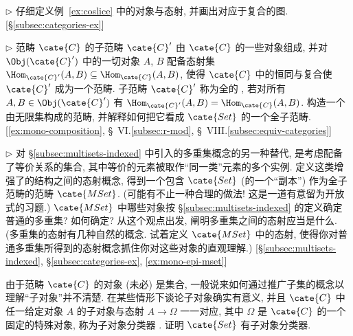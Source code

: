 \begin{prob}
\label{ex:coslice-details}
$\triangleright$ 仔细定义例~\ref{ex:coslice} 中的对象与态射, 并画出对应于复合的图. [\S\ref{subsec:categories-ex}]
\end{prob}

\begin{prob}
\label{ex:subcategory}
$\triangleright$ 范畴 $\cate{C}$ 的子范畴%
$\cate{C}'$ 由 $\cate{C}$ 的一些对象组成, 并对 $\Obj(\cate{C}')$ 中的一切对象 $A$, $B$ 配备态射集 $\Hom_{\cate{C}'}(A,B) \subseteq \Hom_{\cate{C}}(A,B)$, 使得 $\cate{C}$ 中的恒同与复合使 $\cate{C}'$ 成为一个范畴. 子范畴 $\cate{C}'$ 称为全的%
, 若对所有 $A, B \in \Obj(\cate{C}')$ 有 $\Hom_{\cate{C}'}(A,B) = \Hom_{\cate{C}}(A,B)$. 构造一个由无限集构成的范畴, 并解释如何把它看成 $\cate{Set}$ 的一个全子范畴. [\ref{ex:mono-composition}, \S~VI.\ref{subsec:r-mod}, \S~VIII.\ref{subsec:equiv-categories}]
\end{prob}

\begin{prob}
\label{ex:mset-category}
$\triangleright$ 对 \S\ref{subsec:multisets-indexed} 中引入的多重集概念的另一种替代, 是考虑配备了等价关系的集合, 其中等价的元素被取作``同一类''元素的多个实例. 定义这类增强了的结构之间的态射概念, 得到一个包含 $\cate{Set}$ (的一个``副本'') 作为全子范畴的范畴 $\cate{MSet}$. (可能有不止一种合理的做法! 这是一道有意留为开放式的习题.) $\cate{MSet}$ 中哪些对象按 \S\ref{subsec:multisets-indexed} 的定义确定普通的多重集? 如何确定? 从这个观点出发, 阐明多重集之间的态射应当是什么. (多重集的态射有几种自然的概念. 试着定义 $\cate{MSet}$ 中的态射, 使得你对普通多重集所得到的态射概念抓住你对这些对象的直观理解.) [\S\ref{subsec:multisets-indexed}, \S\ref{subsec:categories-ex}, \ref{ex:mono-epi-mset}]
\end{prob}

\begin{prob}
\label{ex:subobject-classifier}
由于范畴 $\cate{C}$ 的对象 (未必) 是集合, 一般说来如何通过推广子集的概念以理解``子对象''并不清楚. 在某些情形下谈论子对象确实有意义, 并且 $\cate{C}$ 中任一给定对象 $A$ 的子对象与态射 $A \to \Omega$ 一一对应, 其中 $\Omega$ 是 $\cate{C}$ 的一个固定的特殊对象, 称为子对象分类器%
. 证明 $\cate{Set}$ 有子对象分类器.
\end{prob}

